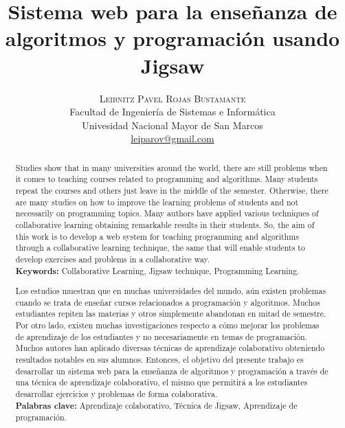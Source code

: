 \documentclass[twoside]{article}
\title{\vspace{-15mm}\fontsize{24pt}{10pt}\selectfont\textbf{Sistema web para la enseñanza de algoritmos y programación usando Jigsaw}} %
\author{
\large
\textsc{Leibnitz Pavel Rojas Bustamante}\\[2mm] %
\normalsize Facultad de Ingeniería de Sistemas e Informática\\
\normalsize Univesidad Nacional Mayor de San Marcos \\ %
\normalsize \href{mailto:leiparov@gmail.com}{leiparov@gmail.com} %
\vspace{-5mm}
}
\date{}
\begin{document}
\maketitle %

\thispagestyle{fancy} %

\renewcommand{\abstractname}{Abstract}
\begin{abstract}
Studies show that in many universities around the world, there are still problems when it comes to teaching courses related to programming and algorithms. Many students repeat the courses and others just leave in the middle of the semester. Otherwise, there are many studies on how to improve the learning problems of students and not necessarily on programming topics. Many authors have applied various techniques of collaborative learning obtaining remarkable results in their students. So, the aim of this work is to develop a web system for teaching programming and algorithms through a collaborative learning technique, the same that will enable students to develop exercises and problems in a collaborative way.\\

\textbf{Keywords:} Collaborative Learning, Jigsaw technique, Programming Learning.
\end{abstract}
\renewcommand{\abstractname}{Resumen}
\begin{abstract}	
	Los estudios muestran que en muchas universidades del mundo, aún existen problemas cuando se trata de enseñar cursos relacionados a programación y algoritmos. Muchos estudiantes repiten las materias y otros simplemente abandonan en mitad de semestre. Por otro lado, existen muchas investigaciones respecto a cómo mejorar los problemas de aprendizaje de los estudiantes y no necesariamente en temas de programación. Muchos autores han aplicado diversas técnicas de aprendizaje colaborativo obteniendo resultados notables en sus alumnos. Entonces, el objetivo del presente trabajo es desarrollar un sistema web para la enseñanza de algoritmos y programación a través de una técnica de aprendizaje colaborativo, el mismo que permitirá a los estudiantes desarrollar ejercicios y problemas de forma colaborativa.\\
	
	\textbf{Palabras clave:} Aprendizaje colaborativo, Técnica de Jigsaw, Aprendizaje de programación.
\end{abstract}
\end{document}
